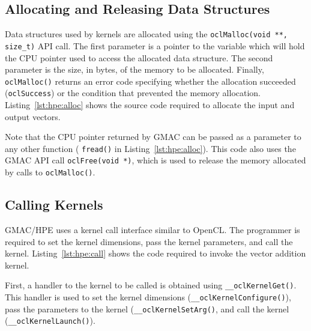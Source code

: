 

\subsection{Allocating and Releasing Data Structures}
Data structures used by kernels are allocated using the \texttt{oclMalloc(void **, size\_t)} API 
call. The first parameter is a pointer to the variable which will hold the CPU pointer used to 
access the allocated data structure. The second parameter is the size, in bytes, of the memory to be 
allocated. Finally, \texttt{oclMalloc()} returns an error code specifying whether the allocation 
succeeded (\texttt{oclSuccess}) or the condition that prevented the memory allocation.  
Listing~\ref{lst:hpe:alloc} shows the source code required to allocate the input and output vectors.  



Note that the CPU pointer returned by GMAC can be passed as a parameter to any other function (\eg 
\texttt{fread()} in Listing~\ref{lst:hpe:alloc}). This code also uses the GMAC API call 
\texttt{oclFree(void *)}, which is used to release the memory allocated by calls to 
\texttt{oclMalloc()}.

\subsection{Calling Kernels}
GMAC\slash HPE uses a kernel call interface similar to OpenCL\@. The programmer is required to set 
the kernel dimensions, pass the kernel parameters, and call the kernel. Listing~\ref{lst:hpe:call} 
shows the code required to invoke the vector addition kernel.



First, a handler to the kernel to be called is obtained using \texttt{\_\_oclKernelGet()}. This 
handler is used to set the kernel dimensions (\texttt{\_\_oclKernelConfigure()}), pass the 
parameters to the kernel (\texttt{\_\_oclKernelSetArg()}, and call the kernel 
(\texttt{\_\_oclKernelLaunch()}).

